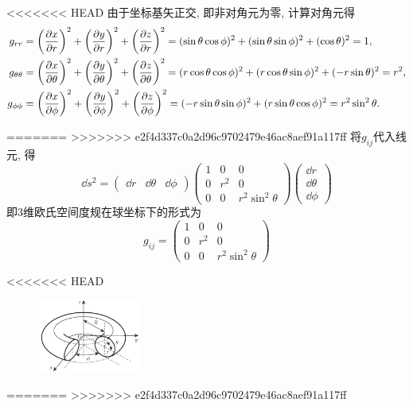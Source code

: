 \begin{solution}
<<<<<<< HEAD
    \vspace*{1em}
    由于坐标基矢正交, 即非对角元为零, 计算对角元得
    \begin{align*}
        g_{rr} &= \left(\frac{\partial x}{\partial r}\right)^2 + \left(\frac{\partial y}{\partial r}\right)^2 + \left(\frac{\partial z}{\partial r}\right)^2 = (\sin \theta \cos \phi)^2 + (\sin \theta \sin \phi)^2 + (\cos \theta)^2 = 1, \\
        g_{\theta\theta} &= \left(\frac{\partial x}{\partial \theta}\right)^2 + \left(\frac{\partial y}{\partial \theta}\right)^2 + \left(\frac{\partial z}{\partial \theta}\right)^2 = (r \cos \theta \cos \phi)^2 + (r \cos \theta \sin \phi)^2 + (-r \sin \theta)^2 = r^2, \\
        g_{\phi\phi} &= \left(\frac{\partial x}{\partial \phi}\right)^2 + \left(\frac{\partial y}{\partial \phi}\right)^2 + \left(\frac{\partial z}{\partial \phi}\right)^2 = (-r \sin \theta \sin \phi)^2 + (r \sin \theta \cos \phi)^2 = r^2 \sin^2\theta.
    \end{align*}

=======
>>>>>>> e2f4d337c0a2d96c9702479e46ac8aef91a117ff
    将$g_{ij}$代入线元, 得
    \[
        \dd s^2 = \begin{pmatrix}
            \dd r & \dd \theta & \dd \phi
        \end{pmatrix} \begin{pmatrix}
            1 & 0 & 0 \\
            0 & r^2 & 0 \\
            0 & 0 & r^2 \sin^2\theta
        \end{pmatrix} \begin{pmatrix}
            \dd r \\ \dd \theta \\ \dd \phi
        \end{pmatrix}
    \]
    即$3$维欧氏空间度规在球坐标下的形式为
    \[
        g_{ij} = \begin{pmatrix}
            1 & 0 & 0 \\
            0 & r^2 & 0 \\
            0 & 0 & r^2 \sin^2\theta
        \end{pmatrix}
    \]
\end{solution}
<<<<<<< HEAD


\begin{figure}[h]
    \centering
    \includegraphics[width=0.3\textwidth]{content/Figures/3-3}
    \caption{ }
    \label{fig:3-3}
\end{figure}

=======
>>>>>>> e2f4d337c0a2d96c9702479e46ac8aef91a117ff

